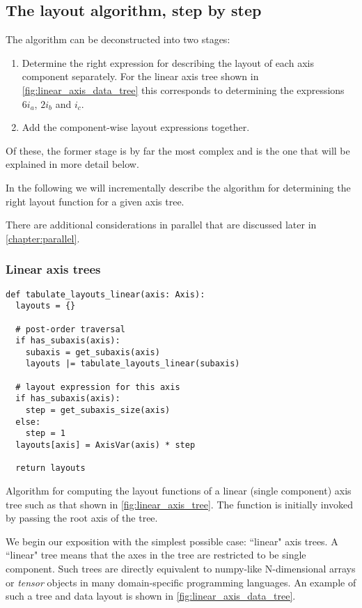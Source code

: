 \documentclass[thesis]{subfiles}
\begin{document}
\subsection{The layout algorithm, step by step}

The algorithm can be deconstructed into two stages:
\begin{enumerate}
  \item
    Determine the right expression for describing the layout of each axis component separately.
    For the linear axis tree shown in \cref{fig:linear_axis_data_tree} this corresponds to determining the expressions $6 i_a$, $2 i_b$ and $i_c$.
  \item
    Add the component-wise layout expressions together.
\end{enumerate}
Of these, the former stage is by far the most complex and is the one that will be explained in more detail below.

In the following we will incrementally describe the algorithm for determining the right layout function for a given axis tree.

There are additional considerations in parallel that are discussed later in \cref{chapter:parallel}.

\subsubsection{Linear axis trees}

\begin{algorithm}
  \begin{verbatim}
def tabulate_layouts_linear(axis: Axis):
  layouts = {}

  # post-order traversal
  if has_subaxis(axis): 
    subaxis = get_subaxis(axis)
    layouts |= tabulate_layouts_linear(subaxis)

  # layout expression for this axis
  if has_subaxis(axis):
    step = get_subaxis_size(axis)
  else:
    step = 1
  layouts[axis] = AxisVar(axis) * step

  return layouts
  \end{verbatim}
  \caption{
    Algorithm for computing the layout functions of a linear (single component) axis tree such as that shown in \cref{fig:linear_axis_tree}.
    The function is initially invoked by passing the root axis of the tree.
  }
  \label{alg:tabulate_layouts_linear}
\end{algorithm}

We begin our exposition with the simplest possible case: ``linear" axis trees.
A ``linear" tree means that the axes in the tree are restricted to be single component.
Such trees are directly equivalent to numpy-like N-dimensional arrays or \textit{tensor} objects in many domain-specific programming languages.
An example of such a tree and data layout is shown in \cref{fig:linear_axis_data_tree}.
\end{document}
